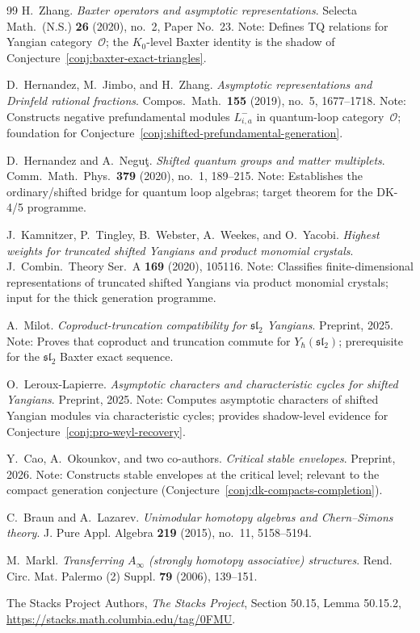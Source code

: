 \begin{thebibliography}{99}
H.~Zhang.
\textit{Baxter operators and asymptotic representations}.
Selecta Math.\ (N.S.) \textbf{26} (2020), no.~2, Paper No.~23.
Note: Defines TQ relations for Yangian category~$\mathcal{O}$;
the $K_0$-level Baxter identity is the shadow of
Conjecture~\ref{conj:baxter-exact-triangles}.

D.~Hernandez, M.~Jimbo, and H.~Zhang.
\textit{Asymptotic representations and Drinfeld rational fractions}.
Compos.\ Math.\ \textbf{155} (2019), no.~5, 1677--1718.
Note: Constructs negative prefundamental modules $L^-_{i,a}$ in
quantum-loop category~$\mathcal{O}$; foundation for
Conjecture~\ref{conj:shifted-prefundamental-generation}.

D.~Hernandez and A.~Negu\c{t}.
\textit{Shifted quantum groups and matter multiplets}.
Comm.\ Math.\ Phys.\ \textbf{379} (2020), no.~1, 189--215.
Note: Establishes the ordinary/shifted bridge for quantum loop algebras;
target theorem for the DK-4/5 programme.

J.~Kamnitzer, P.~Tingley, B.~Webster, A.~Weekes, and O.~Yacobi.
\textit{Highest weights for truncated shifted Yangians and product
monomial crystals}.
J.~Combin.\ Theory Ser.~A \textbf{169} (2020), 105116.
Note: Classifies finite-dimensional representations of truncated
shifted Yangians via product monomial crystals; input for the
thick generation programme.

A.~Milot.
\textit{Coproduct-truncation compatibility for $\mathfrak{sl}_2$ Yangians}.
Preprint, 2025.
Note: Proves that coproduct and truncation commute for
$Y_\hbar(\mathfrak{sl}_2)$; prerequisite for the $\mathfrak{sl}_2$
Baxter exact sequence.

O.~Leroux-Lapierre.
\textit{Asymptotic characters and characteristic cycles for
shifted Yangians}.
Preprint, 2025.
Note: Computes asymptotic characters of shifted Yangian modules
via characteristic cycles; provides shadow-level evidence for
Conjecture~\ref{conj:pro-weyl-recovery}.

Y.~Cao, A.~Okounkov, and two co-authors.
\textit{Critical stable envelopes}.
Preprint, 2026.
Note: Constructs stable envelopes at the critical level; relevant
to the compact generation conjecture
(Conjecture~\ref{conj:dk-compacts-completion}).

C.~Braun and A.~Lazarev.
\textit{Unimodular homotopy algebras and Chern--Simons theory}.
J. Pure Appl. Algebra \textbf{219} (2015), no.~11, 5158--5194.

M.~Markl.
\textit{Transferring $A_\infty$ (strongly homotopy associative)
structures}.
Rend. Circ. Mat. Palermo (2) Suppl. \textbf{79} (2006), 139--151.

The Stacks Project Authors, \emph{The Stacks Project},
Section 50.15, Lemma 50.15.2,
\url{https://stacks.math.columbia.edu/tag/0FMU}.

\end{thebibliography}
